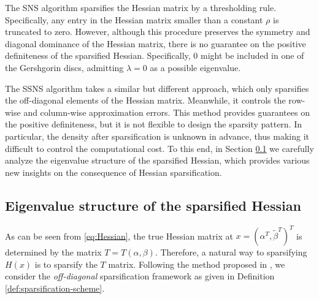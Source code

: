 \documentclass{article}
\theoremstyle{plain}
\theoremstyle{definition}
\theoremstyle{remark}
\begin{document}
The SNS algorithm \citep{tang2024accelerating} sparsifies the Hessian matrix by a thresholding rule. Specifically, any entry in the Hessian matrix smaller than a constant $\rho$ is truncated to zero. However, although this procedure preserves the symmetry and diagonal dominance of the Hessian matrix, there is no guarantee on the positive definiteness of the sparsified Hessian. Specifically, 0 might be included in one of the Gershgorin discs, admitting $\lambda = 0$ as a possible eigenvalue.

The SSNS algorithm \citep{tang2024safe} takes a similar but different approach, which only sparsifies the off-diagonal elements of the Hessian matrix. Meanwhile, it controls the row-wise and column-wise approximation errors. This method provides guarantees on the positive definiteness, but it is not flexible to design the sparsity pattern. In particular, the density after sparsification is unknown in advance, thus making it difficult to control the computational cost. To this end, in Section \ref{subsec:eigenvalue} we carefully analyze the eigenvalue structure of the sparsified Hessian, which provides various new insights on the consequence of Hessian sparsification.


\subsection{Eigenvalue structure of the sparsified Hessian}
\label{subsec:eigenvalue}
As can be seen from \eqref{eq:Hessian}, the true Hessian matrix at $x=(\alpha^T,\tilde{\beta}^T)^T$ is determined by the matrix $T=T(\alpha,\beta)$. Therefore, a natural way to sparsifying $H(x)$ is to sparsify the $T$ matrix. Following the method proposed in \citet{tang2024safe}, we consider the \emph{off-diagonal} sparsification framework as given in Definition \ref{def:sparsification-scheme}.
\end{document}
